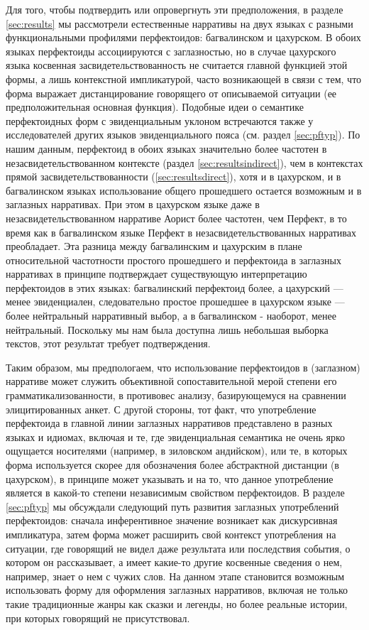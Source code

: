 \par Для того, чтобы подтвердить или опровергнуть эти предположения, в разделе \ref{sec:results} мы рассмотрели естественные нарративы на двух языках с разными функциональными профилями перфектоидов: багвалинском и цахурском. В обоих языках перфектоиды ассоциируются с заглазностью, но в случае цахурского языка косвенная засвидетельствованность не считается главной функцией этой формы, а лишь контекстной импликатурой, часто возникающей в связи с тем, что форма выражает дистанцирование говорящего от описываемой ситуации (ее предположительная основная функция). Подобные идеи о семантике перфектоидных форм с эвиденциальным уклоном встречаются также у исследователей других языков эвиденциального пояса (см. раздел \ref{sec:pftyp}). По нашим данным, перфектоид в обоих языках значительно более частотен в незасвидетельствованном контексте (раздел \ref{sec:resultsindirect}), чем в контекстах прямой засвидетельствованности (\ref{sec:resultsdirect}), хотя и в цахурском, и в багвалинском языках использование общего прошедшего остается возможным и в заглазных нарративах. При этом в цахурском языке даже в незасвидетельствованном нарративе Аорист более частотен, чем Перфект, в то время как в багвалинском языке Перфект в незасвидетельствованных нарративах преобладает. Эта разница между багвалинским и цахурским в плане относительной частотности простого прошедшего и перфектоида в заглазных нарративах в принципе подтверждает существующую интерпретацию перфектоидов в этих языках: багвалинский перфектоид более, а цахурский --- менее эвиденциален, следовательно простое прошедшее в цахурском языке --- более нейтральный нарративный выбор, а в багвалинском - наоборот, менее нейтральный. Поскольку мы нам была доступна лишь небольшая выборка текстов, этот результат требует подтверждения.
\par Таким образом, мы предпологаем, что использование перфектоидов в (заглазном) нарративе может служить объективной сопоставительной мерой степени его грамматикализованности, в противовес анализу, базирующемуся на сравнении элицитированных анкет. С другой стороны, тот факт, что употребление перфектоида в главной линии заглазных нарративов представлено в разных языках и идиомах, включая и те, где эвиденциальная семантика не очень ярко ощущается носителями (например, в зиловском андийском), или те, в которых форма используется скорее для обозначения более абстрактной дистанции (в цахурском), в принципе может указывать и на то, что данное употребление является в какой-то степени независимым свойством перфектоидов. В разделе \ref{sec:pftyp} мы обсуждали следующий путь развития заглазных употреблений перфектоидов: сначала инферентивное значение возникает как дискурсивная импликатура, затем форма может расширить свой контекст употребления на ситуации, где говорящий не видел даже результата или последствия события, о котором он рассказывает, а имеет какие-то другие косвенные сведения о нем, например, знает о нем с чужих слов. На данном этапе становится возможным использовать форму для оформления заглазных нарративов, включая не только такие традиционные жанры как сказки и легенды, но более реальные истории, при которых говорящий не присутствовал.
